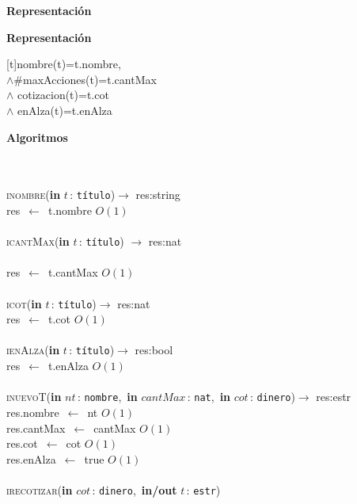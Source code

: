 \documentclass[10pt, a4paper]{article}
\let\NombreFuncion=\textsc
\let\TipoVariable=\texttt
\let\ModificadorArgumento=\textbf
\newcommand{\tab}{\hspace*{7mm}}
\newcommand{\In}[2]{\ModificadorArgumento{in} \ensuremath{#1}\,: \TipoVariable{#2}\xspace}
\newcommand{\Inout}[2]{\ModificadorArgumento{in/out} \ensuremath{#1}\,: \TipoVariable{#2}\xspace}
\newenvironment{Representacion}{%
  \vspace*{2ex}%
  \noindent\textbf{\Large Representaci\'{o}n}%
  \vspace*{2ex}%
}{}
\newenvironment{Algoritmos}{%
  \vspace*{2ex}%
  \noindent\textbf{\Large Algoritmos}%
  \vspace*{2ex}%
}{}
\newcommand{\Title}[1]{
  \vspace*{1ex}\par\noindent\textbf{\large #1}\par
}
\begin{document}
\begin{Representacion}
 \Title{Representaci\'{o}n}
    \begin{Tupla}[t\'{i}tulo] 
    \end{Tupla} 
    
      \mbox{}
      [t]{nombre(t)=t.nombre,\\$\wedge \#$maxAcciones(t)=t.cantMax\\$\wedge$ cotizacion(t)=t.cot \\$\wedge$ enAlza(t)=t.enAlza}
      
\end{Representacion}
\begin{Algoritmos}
\\ \\
  \NombreFuncion{inombre}(\In{t}{t\'{i}tulo})$\rightarrow$ res:string
\\
\tab res\ $\leftarrow$\ t.nombre \hfill $O(1)$
\\ \\
  \NombreFuncion{icantMax}(\In{t}{t\'{i}tulo}) $\rightarrow$ res:nat
\end{Algoritmos}
\\ \\
\tab res\ $\leftarrow$\ t.cantMax \hfill $O(1)$
\\ \\
  \NombreFuncion{icot}(\In{t}{t\'{i}tulo})$\rightarrow$ res:nat
\\
\tab res\ $\leftarrow$\ t.cot \hfill $O(1)$
\\ \\
  \NombreFuncion{ienAlza}(\In{t}{t\'{i}tulo})$\rightarrow$ res:bool
\\
\tab res\ $\leftarrow$\ t.enAlza \hfill $O(1)$
\\ \\
  \NombreFuncion{inuevoT}(\In{nt}{nombre},\ \In{cantMax}{nat},\ \In{cot}{dinero})$\rightarrow$ res:estr
\\
\tab res.nombre\ $\leftarrow$\ nt \hfill $O(1)$
\\
\tab res.cantMax\ $\leftarrow$\ cantMax \hfill $O(1)$
\\
\tab res.cot\ $\leftarrow$\ cot \hfill $O(1)$
\\
\tab res.enAlza\ $\leftarrow$\ true \hfill $O(1)$
\\ \\
  \NombreFuncion{irecotizar}(\In{cot}{dinero},\ \Inout{t}{estr})
\end{document}
